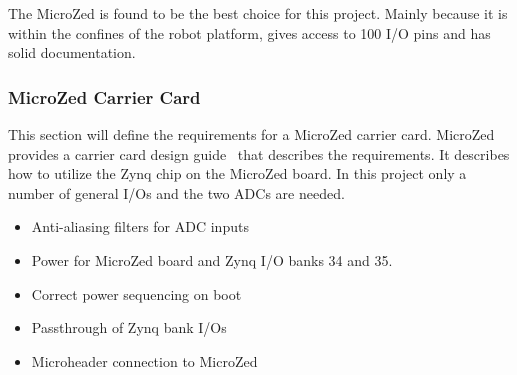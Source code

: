 The MicroZed is found to be the best choice for this project.
Mainly because it is within the confines of the robot platform, gives access to 100 I/O pins and has solid documentation.

\subsubsection*{MicroZed Carrier Card}
This section will define the requirements for a MicroZed carrier card.
MicroZed provides a carrier card design guide~\cite{design_carrier} that describes the requirements.
It describes how to utilize the Zynq chip on the MicroZed board.
In this project only a number of general I/Os and the two ADCs are needed.


\begin{itemize}
	\item Anti-aliasing filters for ADC inputs
	\item Power for MicroZed board and Zynq I/O banks 34 and 35.
	\item Correct power sequencing on boot
	\item Passthrough of Zynq bank I/Os
	\item Microheader connection to MicroZed
\end{itemize}

